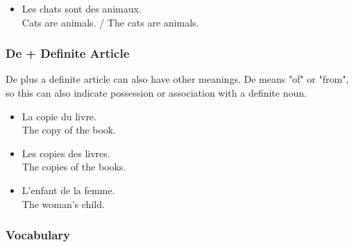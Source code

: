 \begin{itemize}
  \item  Les chats sont des animaux. \\ Cats are animals. / The cats are animals.
\end{itemize}
    
\subsubsection{De + Definite Article}

De plus a definite article can also have other meanings. De means "of" or "from", so this can also indicate possession or association with a definite noun.

\begin{itemize}
  \item  La copie du livre. \\ The copy of the book.
  \item  Les copies des livres. \\ The copies of the books.
  \item  L'enfant de la femme. \\ The woman's child.
\end{itemize}

\subsubsection{Vocabulary}

